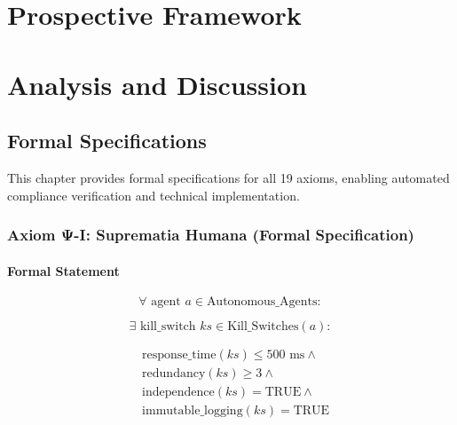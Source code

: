 \documentclass[12pt,a4paper,twoside,openright]{book}
\begin{document}
\part{Prospective Framework}












\part{Analysis and Discussion}

\chapter{Formal Specifications}
\label{ch:formal-specs}

This chapter provides formal specifications for all 19 axioms, enabling automated compliance verification and technical implementation.

\section{Axiom Ψ-I: Suprematia Humana (Formal Specification)}

\subsection{Formal Statement}

\begin{equation}
\forall \text{ agent } a \in \text{Autonomous\_Agents}:
\end{equation}

\begin{equation}
\exists \text{ kill\_switch } ks \in \text{Kill\_Switches}(a):
\end{equation}

\begin{align}
&\text{response\_time}(ks) \leq 500\text{ ms} \land \\
&\text{redundancy}(ks) \geq 3 \land \\
&\text{independence}(ks) = \text{TRUE} \land \\
&\text{immutable\_logging}(ks) = \text{TRUE}
\end{align}
\end{document}
